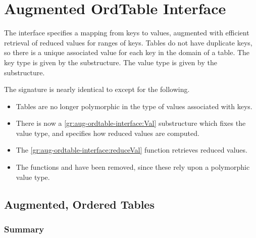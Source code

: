 \chapter{Augmented OrdTable Interface}
\label{ch:aug-ordtable-interface}
\begin{preamble}
The  interface specifies a mapping from keys to values,
augmented with
efficient retrieval of reduced values for ranges of keys. Tables do not have
duplicate
keys, so there is a unique associated value for each key in the domain of
a table. The key type is given by the  substructure. The value type
is given by the  substructure.
\end{preamble}

\begin{note}
The  signature is nearly identical to  except
for the following.
\begin{itemize}
  \item Tables are no longer polymorphic in the type of values associated with
  keys.
  \item There is now a \ref{gr:aug-ordtable-interface:Val} substructure which
  fixes the value type, and specifies how reduced values are computed.
  \item The \ref{gr:aug-ordtable-interface:reduceVal} function retrieves
  reduced values.
  \item The functions  and  have been
  removed, since these rely upon a polymorphic value type.
\end{itemize}
\end{note}

\section{Augmented, Ordered Tables}

\subsection{Summary}

